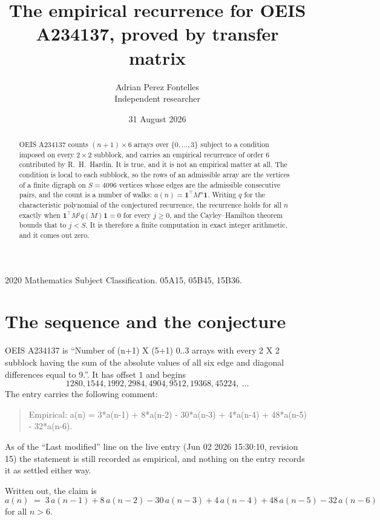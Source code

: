 \documentclass[11pt,a4paper]{article}
\title{The empirical recurrence for OEIS A234137, proved by transfer matrix}
\author{Adrian Perez Fontelles\\ \small Independent researcher}
\date{31 August 2026}
\theoremstyle{plain}
\theoremstyle{definition}
\begin{document}
\maketitle

\begin{abstract}
OEIS A234137 counts $(n+1)\times6$ arrays over $\{0,\dots,3\}$ subject to a condition imposed on
every $2\times2$ subblock, and carries an empirical recurrence of order $6$ contributed
by R.~H.~Hardin. It is true, and it is not an empirical matter at all. The condition is local
to each subblock, so the rows of an admissible array are the vertices of a finite digraph
on $S=4096$ vertices whose edges are the admissible consecutive pairs, and the count is a
number of walks: $a(n)=\mathbf{1}^{\!\top}M^{n}\mathbf{1}$. Writing $q$
for the characteristic polynomial of the conjectured recurrence, the recurrence holds for all
$n$ exactly when $\mathbf{1}^{\!\top}M^{j}q(M)\mathbf{1}=0$ for every $j\ge0$, and the
Cayley--Hamilton theorem bounds that to $j<S$. It is therefore a finite computation in exact
integer arithmetic, and it comes out zero.
\end{abstract}

\noindent\small 2020 Mathematics Subject Classification. 05A15, 05B45, 15B36.\normalsize

\section{The sequence and the conjecture}

OEIS A234137 is ``Number of (n+1) X (5+1) 0..3 arrays with every 2 X 2 subblock having the sum of the absolute values of all six edge and diagonal differences equal to 9.''. It has offset $1$ and begins
\[
1280, 1544, 1992, 2984, 4904, 9512, 19368, 45224,\ \dots
\]
The entry carries the following comment:
\begin{quote}\small
Empirical: a(n) = 3*a(n-1) + 8*a(n-2) - 30*a(n-3) + 4*a(n-4) + 48*a(n-5) - 32*a(n-6).
\end{quote}
As of the ``Last modified'' line on the live entry (Jun 02 2026 15:30:10, revision 15) the statement is
still recorded as empirical, and nothing on the entry records it as settled either way.

Written out, the claim is
\begin{equation}\label{eq:conj}
a(n)\;=\;3\,a(n-1) + 8\,a(n-2) - 30\,a(n-3) + 4\,a(n-4) + 48\,a(n-5) - 32\,a(n-6)
\end{equation}
for all $n>6$.
\end{document}
